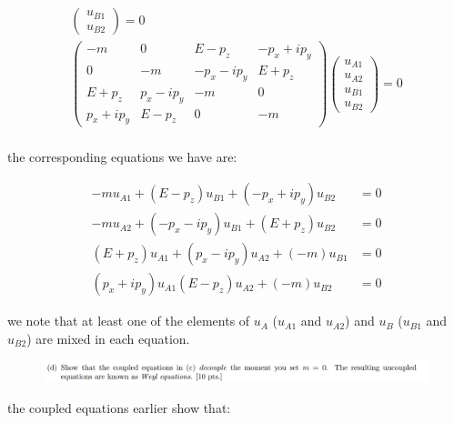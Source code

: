 \documentclass[11pt]{article}
\theoremstyle{definition}
\begin{document}
\begin{align}
\begin{pmatrix}
    u_{B1}\\
    u_{B2}
\end{pmatrix}    
=0\\
\begin{pmatrix}
    -m & 0 & E-p_z & -p_x+ip_y\\
    0 & -m & -p_x-ip_y & E+p_z\\
    E+p_z & p_x-ip_y & -m & 0\\
    p_x+ip_y & E-p_z & 0 & -m 
\end{pmatrix}
\begin{pmatrix}
    u_{A1}\\
    u_{A2}\\
    u_{B1}\\
    u_{B2}
\end{pmatrix}    
=0\\
\end{align}

the corresponding equations we have are:

\begin{align}
    -mu_{A1} + (E-p_z)u_{B1} + (-p_x+ip_y)u_{B2} &= 0\\
    -mu_{A2} + (-p_x-ip_y)u_{B1} + (E + p_z) u_{B2} &= 0\\
    (E+p_z)u_{A1} + (p_x-ip_y)u_{A2} + (-m)u_{B1} &= 0\\
    (p_x+ip_y)u_{A1} (E-p_z)u_{A2} + (-m)u_{B2} &= 0
\end{align}

we note that at least one of the elements of $u_A$ ($u_{A1}$ and $u_{A2}$) and $u_B$ ($u_{B1}$ and $u_{B2}$) are mixed in each equation.

 
\newpage



\begin{figure}[H]
    \centering
    \includegraphics[scale = 0.5]{2d.png}
\end{figure}

the coupled equations earlier show that:
\end{document}
